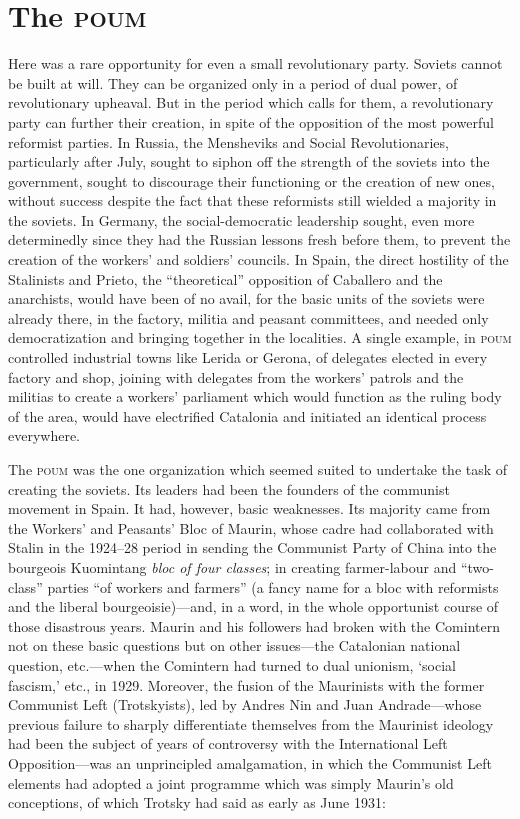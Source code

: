 \section{The \textsc{poum}}

Here was a rare opportunity for even a small revolutionary party. Soviets cannot be built at will. They can be organized only in a period of dual power, of revolutionary upheaval. But in the period which calls for them, a revolutionary party can further their creation, in spite of the opposition of the most powerful reformist parties. In Russia, the Mensheviks and Social Revolutionaries, particularly after July, sought to siphon off the strength of the soviets into the government, sought to discourage their functioning or the creation of new ones, without success despite the fact that these reformists still wielded a majority in the soviets. In Germany, the social-democratic leadership sought, even more determinedly since they had the Russian lessons fresh before them, to prevent the creation of the workers’ and soldiers’ councils. In Spain, the direct hostility of the Stalinists and Prieto, the ``theoretical'' opposition of Caballero and the anarchists, would have been of no avail, for the basic units of the soviets were already there, in the factory, militia and peasant committees, and needed only democratization and bringing together in the localities. A single example, in \textsc{poum} controlled industrial towns like Lerida or Gerona, of delegates elected in every factory and shop, joining with delegates from the workers’ patrols and the militias to create a workers’ parliament which would function as the ruling body of the area, would have electrified Catalonia and initiated an identical process everywhere.

The \textsc{poum} was the one organization which seemed suited to undertake the task of creating the soviets. Its leaders had been the founders of the communist movement in Spain. It had, however, basic weaknesses. Its majority came from the {Workers’ and Peasants’ Bloc of Maurin}, whose cadre had collaborated with Stalin in the 1924–28 period in sending the Communist Party of China into the bourgeois Kuomintang \emph{bloc of four classes}; in creating farmer-labour and ``two-class'' parties ``of workers and farmers'' (a fancy name for a bloc with reformists and the liberal bourgeoisie)---and, in a word, in the whole opportunist course of those disastrous years. Maurin and his followers had broken with the Comintern not on these basic questions but on other issues---the Catalonian national question, etc.---when the Comintern had turned to dual unionism, ‘social fascism,’ etc., in 1929. Moreover, the fusion of the Maurinists with the former {Communist Left} (Trotskyists), led by Andres Nin and Juan Andrade---whose previous failure to sharply differentiate themselves from the Maurinist ideology had been the subject of years of controversy with the International Left Opposition---was an unprincipled amalgamation, in which the Communist Left elements had adopted a joint programme which was simply Maurin’s old conceptions, of which Trotsky had said as early as June 1931:

